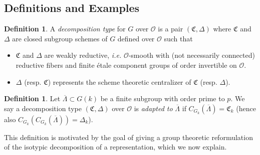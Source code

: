 \documentclass[11pt, letterpaper,english]{amsart}
\theoremstyle{plain}
\theoremstyle{definition}
\newtheorem{defn}[lem]{Definition}
\numberwithin{equation}{section}
\numberwithin{lem}{section}
\newcommand{\fC}{\mathfrak{C}}
\newcommand{\cO}{\mathcal{O}}
\newcommand{\cent}[2]{C_{#1}(#2)}
\newcommand{\Lbar}{\overline{\Lambda}}
\newcommand{\Dt}{\Delta}
\begin{document}
\subsection{Definitions and Examples} \label{ss:decomposition defs}

%

\begin{defn} \label{def:decomp type}
A \emph{decomposition type} for $G$ over $\cO$ is a pair $(\fC, \Dt)$ where $\fC$ and $\Dt$ are closed subgroup schemes of $G$ defined over $\cO$ such that 
\begin{itemize}
    \item $\fC$ and $\Dt$ are weakly reductive, \textit{i.e.} $\cO$-smooth with (not necessarily connected) reductive fibers and finite \'{e}tale component groups of order invertible on $\cO$.
    \item $\Dt$ (resp. $\fC$) represents the scheme theoretic centralizer of $\fC$ (resp. $\Dt$).
\end{itemize}
\end{defn}


\begin{defn} \label{def:adapted}
Let $\Lbar \subset G(k)$ be a finite subgroup with order prime to $p$. We say a decomposition type $(\fC, \Dt)$ over $\cO$ is \emph{adapted to} $\Lbar$ if 
$\cent{G_k}{\Lbar}=\fC_k$ (hence also $\cent{G_k}{\cent{G_k}{\Lbar}}=\Dt_k$).
\end{defn}


This definition is motivated by the goal of giving a group theoretic reformulation of the isotypic decomposition of a representation, which we now explain.  
\end{document}
